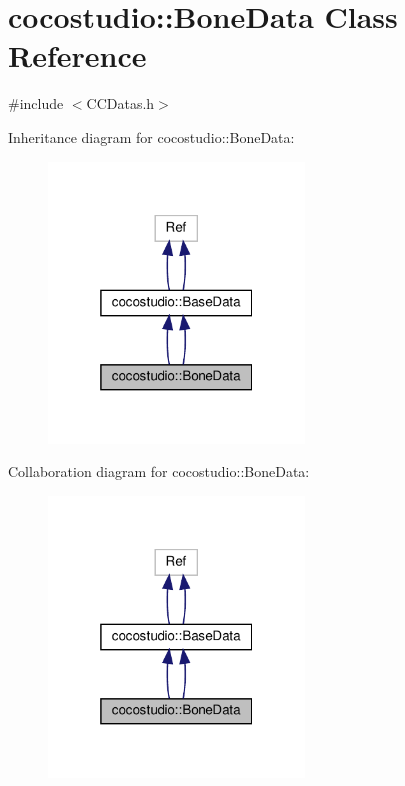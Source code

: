 \hypertarget{classcocostudio_1_1BoneData}{}\section{cocostudio\+:\+:Bone\+Data Class Reference}
\label{classcocostudio_1_1BoneData}


{\ttfamily \#include $<$C\+C\+Datas.\+h$>$}



Inheritance diagram for cocostudio\+:\+:Bone\+Data\+:
\nopagebreak
\begin{figure}[H]
\begin{center}
\leavevmode
\includegraphics[width=193pt]{classcocostudio_1_1BoneData__inherit__graph}
\end{center}
\end{figure}


Collaboration diagram for cocostudio\+:\+:Bone\+Data\+:
\nopagebreak
\begin{figure}[H]
\begin{center}
\leavevmode
\includegraphics[width=193pt]{classcocostudio_1_1BoneData__coll__graph}
\end{center}
\end{figure}
